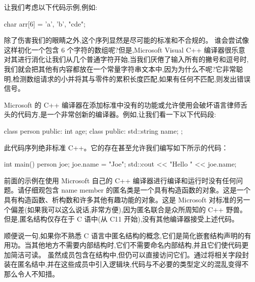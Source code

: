 让我们考虑以下代码示例,例如:

\begin{cpp}
char arr[6] = {'a', 'b', "cde"};
\end{cpp}

除了伤害我们的眼睛之外,这个序列显然是尽可能的标准和不合规的。 谁会尝试像这样初化一个包含 6 个字符的数组呢?但是,Microsoft Visual C++ 编译器很乐意对其进行消化让我们从几个普通字符开始,当我们厌倦了输入所有的撇号和逗号时,我们就会把其他有内容都放在一个常量字符串文本中,因为为什么不呢?它非常聪明,检测数组请求的小并将其与零件的累积长度匹配,如果有任何不匹配,则发出错误信号。

Microsoft 的 C++ 编译器在添加标准中没有的功能或允许使用会破坏语言律师舌头的代码方,是一个非常创新的编译器。例如,让我们看一下以下代码段:

\begin{cpp}
class person {
public:
  int age;
  class {
  public:
    std::string name;
  };
}
\end{cpp}

此代码序列绝非标准 C++。它的存在甚至允许我们编写如下所示的代码：

\begin{cpp}
int main() {
  person joe;
  joe.name = "Joe";
  std::cout << "Hello " << joe.name;
}
\end{cpp}

前面的示例在使用 Microsoft 自己的 C++ 编译器进行编译和运行时没有任何问题。请仔细观包含 name member 的匿名类是一个具有构造函数的对象。这是一个具有构造函数、析构数和许多其他有趣功能的对象。这是 Microsoft 对标准的另一个偏差(如果我可以这么说话,非常方便),因为匿名联合是众所周知的 C++ 野兽。但是,匿名结构仅存在于 C 语中(从 C11 开始),没有其他编译器接受上述代码。

顺便说一句,如果你不熟悉 C 语言中匿名结构的概念,它们是简化嵌套结构声明的有用功。当其他地方不需要内部结构时,它们不需要命名内部结构,并且它们使代码更加简洁可读。 虽然成员包含在结构中,但仍可以直接访问它们。通过将相关字段封装在匿名结中,并在这些成员中引入逻辑块,代码与不必要的类型定义的混乱变得不那么令人不知措。




